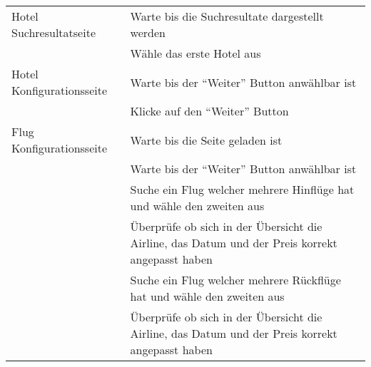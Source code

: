 \begin{table}[H]
\begin{tabularx}{0.9\textwidth}{ | l | X | }
		\multirow{1}{*}{Hotel Suchresultatseite} & Warte bis die Suchresultate dargestellt werden \\ \cline{2-2}
		& Wähle das erste Hotel aus \\ \hline
		
		\multirow{1}{*}{Hotel Konfigurationsseite} & Warte bis der "`Weiter"' Button anwählbar ist \\ \cline{2-2}
		& Klicke auf den "`Weiter"' Button \\ \hline
				
		\multirow{1}{*}{Flug Konfigurationsseite} & Warte bis die Seite geladen ist \\ \cline{2-2}
		& Warte bis der "`Weiter"' Button anwählbar ist \\ \cline{2-2}
		& Suche ein Flug welcher mehrere Hinflüge hat und wähle den zweiten aus \\ \cline{2-2}
		& Überprüfe ob sich in der Übersicht die Airline, das Datum und der Preis korrekt angepasst haben\\ \cline{2-2}
		& Suche ein Flug welcher mehrere Rückflüge hat und wähle den zweiten aus \\ \cline{2-2}
		& Überprüfe ob sich in der Übersicht die Airline, das Datum und der Preis korrekt angepasst haben\\ \cline{2-2}
	\end{tabularx} 
\end{table}

